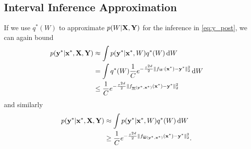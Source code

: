 \documentclass[10pt, a4paper]{article}
\begin{document}
\subsection{Interval Inference Approximation}\label{sec:interval_inference}
If we use $q^\ast(W)$ to approximate $p(W\vert\mathbf{X},\mathbf{Y})$ for the inference in \cref{eq:y_post}, we can again bound
\begin{align*}
 p(\mathbf{y}^\ast\vert\mathbf{x}^\ast,\mathbf{X},\mathbf{Y}) & \approx \int p(\mathbf{y}^\ast\vert\mathbf{x}^\ast,W) q^\ast(W)\,\mathrm{d} W \\
 &= \int q^\ast(W) \frac{1}{C} e^{-\frac{\tau^{2d}}{2}\|f_W(\mathbf{x}^\ast)-\mathbf{y}^\ast\|_2^2} \,\mathrm{d} W \\
 &\leq \frac{1}{C} e^{-\frac{\tau^{2d}}{2} \|f_{\underline{\mathbf{w}}(\mathbf{y}^\ast,\mathbf{x}^\ast)}(\mathbf{x}^\ast) - \mathbf{y}^\ast\|_2^2}
\end{align*}
and similarly
\begin{align*}
 p(\mathbf{y}^\ast\vert\mathbf{x}^\ast,\mathbf{X},\mathbf{Y}) & \approx \int p(\mathbf{y}^\ast\vert\mathbf{x}^\ast,W) q^\ast(W)\,\mathrm{d} W \\
 &\geq \frac{1}{C} e^{-\frac{\tau^{2d}}{2} \|f_{\overline{\mathbf{w}}(\mathbf{y}^\ast,\mathbf{x}^\ast)}(\mathbf{x}^\ast) - \mathbf{y}^\ast\|_2^2}.
\end{align*}
\end{document}
